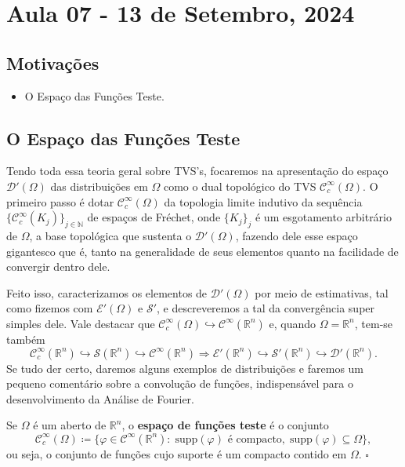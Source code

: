 \documentclass[../distribution_theory_notes.tex]{subfiles}
\begin{document}
\section{Aula 07 - 13 de Setembro, 2024}
\subsection{Motivações}
\begin{itemize}
	\item O Espaço das Funções Teste.
\end{itemize}
\subsection{O Espaço das Funções Teste}
Tendo toda essa teoria geral sobre TVS's, focaremos na apresentação do espaço \(\mathcal{D}'(\Omega )\) das distribuições em \(\Omega \) como o dual topológico do TVS \(\mathcal{C}_{c}^{\infty}(\Omega ).\) O primeiro passo é dotar \(\mathcal{C}_{c}^{\infty}(\Omega )\) da topologia limite indutivo da sequência \(\{\mathcal{C}_{c}^{\infty}(K_{j})\}_{j\in \mathbb{N}}\) de espaços de Fréchet, onde \(\{K_{j}\}_{j}\) é um esgotamento arbitrário de \(\Omega \), a base topológica que sustenta o \(\mathcal{D}'(\Omega )\), fazendo dele esse espaço gigantesco que é, tanto na generalidade de seus elementos quanto na facilidade de convergir dentro dele.

Feito isso, caracterizamos os elementos de \(\mathcal{D}'(\Omega )\) por meio de estimativas, tal como fizemos com \(\mathcal{E}'(\Omega )\) e \(\mathcal{S}'\), e descreveremos a tal da convergência super simples dele. Vale destacar que \(\mathcal{C}_{c}^{\infty}(\Omega )\hookrightarrow \mathcal{C}^{\infty}(\mathbb{R}^{n})\) e, quando \(\Omega =\mathbb{R}^{n}\), tem-se também
\[
	\mathcal{C}_{c}^{\infty}(\mathbb{R}^{n})\hookrightarrow \mathcal{S}(\mathbb{R}^{n})\hookrightarrow \mathcal{C}^{\infty}(\mathbb{R}^{n}) \Rightarrow \mathcal{E}'(\mathbb{R}^{n})\hookrightarrow \mathcal{S}'(\mathbb{R}^{n})\hookrightarrow \mathcal{D}'(\mathbb{R}^{n}).
\]
Se tudo der certo, daremos alguns exemplos de distribuições e faremos um pequeno comentário sobre a convolução de funções, indispensável para o desenvolvimento da Análise de Fourier.

\begin{def*}
	Se \(\Omega \) é um aberto de \(\mathbb{R}^{n}\), o \textbf{espaço de funções teste} é o conjunto
	\[
		\mathcal{C}_{c}^{\infty}(\Omega )\coloneqq \{\varphi \in \mathcal{C}^{\infty}(\mathbb{R}^{n}):\; \mathrm{supp}(\varphi )\text{ é compacto},\; \mathrm{supp}(\varphi )\subseteq \Omega \},
	\]
	ou seja, o conjunto de funções cujo suporte é um compacto contido em \(\Omega \). \(\square\)
\end{def*}
\end{document}
